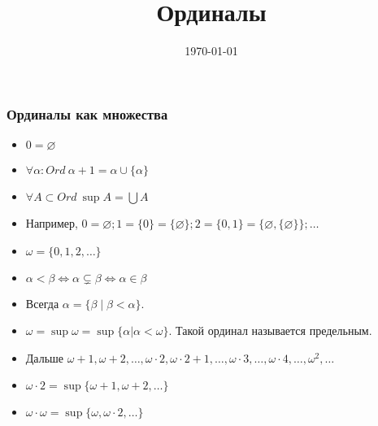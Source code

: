 \documentclass[10pt]{beamer}
\title{Ординалы}
\date{\today}
\begin{document}
\begin{frame}[plain]
    \maketitle
\end{frame}

\begin{frame}
    \frametitle{Ординалы как множества}
    \begin{itemize}
        \item $0 = \varnothing$
        \item $\forall \alpha : Ord ~ \alpha + 1 = \alpha \cup \{\alpha\}$
        \item $\forall A \subset Ord ~ \sup A = \bigcup A$ 
        \pause
        \item Например, $0 = \varnothing; 1 = \{0\} = \{\varnothing\}; 2 = \{0,1\} = \{\varnothing, \{\varnothing\}\}; \ldots$
        \item $\omega = \{0,1,2,\ldots\}$
        \pause
        \item $\alpha < \beta \Leftrightarrow \alpha \subsetneq \beta \Leftrightarrow \alpha \in \beta$
        \item Всегда $\alpha = \{\beta \mid \beta < \alpha\}$.
        \pause
        \item $\omega = \sup \omega = \sup \{\alpha | \alpha < \omega\}$. Такой ординал называется предельным.
        \item Дальше $\omega + 1, \omega + 2, \ldots, \omega \cdot 2, \omega \cdot 2 + 1, \ldots, \omega \cdot 3, \ldots, \omega \cdot 4, \ldots, \omega^2, \ldots$
        \item $\omega \cdot 2 = \sup \{\omega + 1, \omega +2, \ldots\}$
        \item $\omega \cdot \omega = \sup \{\omega, \omega \cdot 2, \ldots\}$
    \end{itemize}
\end{frame}
\end{document}
